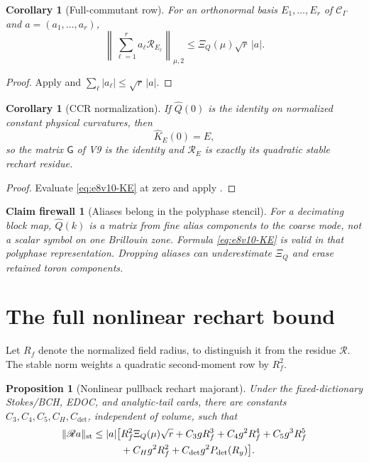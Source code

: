 \documentclass[11pt,oneside]{book}
\newtheorem{proposition}[theorem]{Proposition}
\newtheorem{corollary}[theorem]{Corollary}
\newtheorem{firewall}[theorem]{Claim firewall}
\theoremstyle{definition}
\theoremstyle{remark}
\begin{document}
\begin{corollary}[Full-commutant row]
\label{cor:e8v10-commutant-row}
For an orthonormal basis \(E_1,\ldots,E_r\) of
\({\mathcal C}_\Gamma\) and \(a=(a_1,\ldots,a_r)\),
\[
 \left\|\sum_{\ell=1}^ra_\ell{\mathscr R}_{E_\ell}
 \right\|_{\mu,2}
 \le \Xi_Q(\mu)\sqrt r\,|a|.                        \label{eq:e8v10-full-row}
\]
\end{corollary}

\begin{proof}
Apply  and
\(\sum_\ell|a_\ell|\le\sqrt r\,|a|\).
\end{proof}

\begin{corollary}[CCR normalization]
\label{cor:e8v10-CCR}
If \(\widehat Q(0)\) is the identity on normalized constant physical
curvatures, then
\[
 \widehat K_E(0)=E,
\]
so the matrix \({\mathsf G}\) of V9 is the identity and
\({\mathscr R}_E\) is exactly its quadratic stable rechart residue.
\end{corollary}

\begin{proof}
Evaluate \eqref{eq:e8v10-KE} at zero and apply
.
\end{proof}

\begin{firewall}[Aliases belong in the polyphase stencil]
\label{fire:e8v10-alias}
For a decimating block map, \(\widehat Q(k)\) is a matrix from fine
alias components to the coarse mode, not a scalar symbol on one
Brillouin zone.  Formula \eqref{eq:e8v10-KE} is valid in that
polyphase representation.  Dropping aliases can underestimate
\(\Xi_Q\) and erase retained toron components.
\end{firewall}

\section{The full nonlinear rechart bound}
\label{sec:e8v10-nonlinear}

Let \(R_f\) denote the normalized field radius, to distinguish it
from the residue \({\mathscr R}\).  The stable norm weights a
quadratic second-moment row by \(R_f^2\).

\begin{proposition}[Nonlinear pullback rechart majorant]
\label{prop:e8v10-nonlinear-rechart}
Under the fixed-dictionary Stokes/BCH, EDOC, and analytic-tail cards,
there are constants \(C_3,C_4,C_5,C_H,C_{\det}\), independent of
volume, such that
\begin{align}
 \|{\mathscr R}a\|_{\rm st}
 \le |a|\bigl[&
 R_f^2\Xi_Q(\mu)\sqrt r
 +C_3gR_f^3+C_4g^2R_f^4+C_5g^3R_f^5 \notag\\
 &+C_Hg^2R_f^2+C_{\det}g^2P_{\det}(R_y)\bigr].
                                                        \label{eq:e8v10-rechart-majorant}
\end{align}
\end{proposition}
\end{document}
